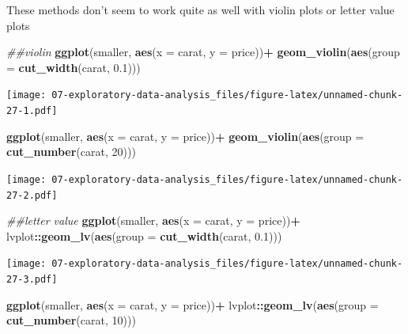 \documentclass[]{book}
\newenvironment{Shaded}{\begin{snugshade}}{\end{snugshade}}
\newcommand{\CommentTok}[1]{\textcolor[rgb]{0.56,0.35,0.01}{\textit{#1}}}
\newcommand{\DataTypeTok}[1]{\textcolor[rgb]{0.13,0.29,0.53}{#1}}
\newcommand{\DecValTok}[1]{\textcolor[rgb]{0.00,0.00,0.81}{#1}}
\newcommand{\FloatTok}[1]{\textcolor[rgb]{0.00,0.00,0.81}{#1}}
\newcommand{\KeywordTok}[1]{\textcolor[rgb]{0.13,0.29,0.53}{\textbf{#1}}}
\newcommand{\NormalTok}[1]{#1}
\newcommand{\OperatorTok}[1]{\textcolor[rgb]{0.81,0.36,0.00}{\textbf{#1}}}
\newcommand{\StringTok}[1]{\textcolor[rgb]{0.31,0.60,0.02}{#1}}
\theoremstyle{definition}
\theoremstyle{definition}
\theoremstyle{definition}
\theoremstyle{remark}
\begin{document}
These methods don't seem to work quite as well with violin plots or
letter value plots

\begin{Shaded}
\begin{Highlighting}[]
\CommentTok{##violin}
\KeywordTok{ggplot}\NormalTok{(smaller, }\KeywordTok{aes}\NormalTok{(}\DataTypeTok{x =}\NormalTok{ carat, }\DataTypeTok{y =}\NormalTok{ price))}\OperatorTok{+}
\StringTok{  }\KeywordTok{geom_violin}\NormalTok{(}\KeywordTok{aes}\NormalTok{(}\DataTypeTok{group =} \KeywordTok{cut_width}\NormalTok{(carat, }\FloatTok{0.1}\NormalTok{)))}
\end{Highlighting}
\end{Shaded}

\texttt{[image: 07-exploratory-data-analysis\_files/figure-latex/unnamed-chunk-27-1.pdf]}

\begin{Shaded}
\begin{Highlighting}[]
\KeywordTok{ggplot}\NormalTok{(smaller, }\KeywordTok{aes}\NormalTok{(}\DataTypeTok{x =}\NormalTok{ carat, }\DataTypeTok{y =}\NormalTok{ price))}\OperatorTok{+}
\StringTok{  }\KeywordTok{geom_violin}\NormalTok{(}\KeywordTok{aes}\NormalTok{(}\DataTypeTok{group =} \KeywordTok{cut_number}\NormalTok{(carat, }\DecValTok{20}\NormalTok{)))}
\end{Highlighting}
\end{Shaded}

\texttt{[image: 07-exploratory-data-analysis\_files/figure-latex/unnamed-chunk-27-2.pdf]}

\begin{Shaded}
\begin{Highlighting}[]
\CommentTok{##letter value}
\KeywordTok{ggplot}\NormalTok{(smaller, }\KeywordTok{aes}\NormalTok{(}\DataTypeTok{x =}\NormalTok{ carat, }\DataTypeTok{y =}\NormalTok{ price))}\OperatorTok{+}
\StringTok{  }\NormalTok{lvplot}\OperatorTok{::}\KeywordTok{geom_lv}\NormalTok{(}\KeywordTok{aes}\NormalTok{(}\DataTypeTok{group =} \KeywordTok{cut_width}\NormalTok{(carat, }\FloatTok{0.1}\NormalTok{)))}
\end{Highlighting}
\end{Shaded}

\texttt{[image: 07-exploratory-data-analysis\_files/figure-latex/unnamed-chunk-27-3.pdf]}

\begin{Shaded}
\begin{Highlighting}[]
\KeywordTok{ggplot}\NormalTok{(smaller, }\KeywordTok{aes}\NormalTok{(}\DataTypeTok{x =}\NormalTok{ carat, }\DataTypeTok{y =}\NormalTok{ price))}\OperatorTok{+}
\StringTok{  }\NormalTok{lvplot}\OperatorTok{::}\KeywordTok{geom_lv}\NormalTok{(}\KeywordTok{aes}\NormalTok{(}\DataTypeTok{group =} \KeywordTok{cut_number}\NormalTok{(carat, }\DecValTok{10}\NormalTok{)))}
\end{Highlighting}
\end{Shaded}
\end{document}
